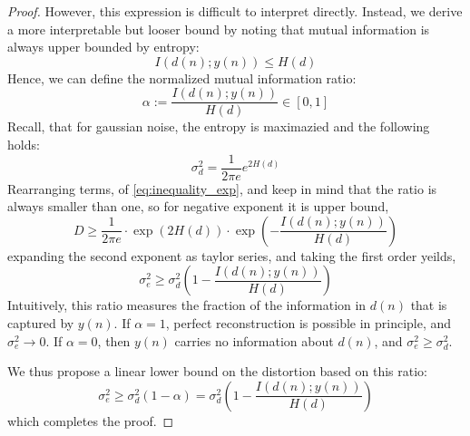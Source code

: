 \documentclass[10pt,a4paper]{amsart}
\begin{document}
\begin{proof}
However, this expression is difficult to interpret directly. Instead, we derive a more interpretable but looser bound by noting that mutual information is always upper bounded by entropy:
\[
I(d(n); y(n)) \leq H(d)
\]
Hence, we can define the normalized mutual information ratio:
\[
\alpha := \frac{I(d(n); y(n))}{H(d)} \in [0, 1]
\]
Recall, that for gaussian noise, the entropy is maximazied and the following holds:
\[
\sigma^2_d  = \frac{1}{2\pi e}e^{2H(d)} \]
Rearranging terms, of \eqref{eq:inequality_exp}, and keep in mind that the ratio is always smaller than one, so for negative exponent it is upper bound,
\[
D \geq \frac{1}{2\pi e} \cdot \exp\left(2H(d)\right) \cdot \exp\left(- \frac{I(d(n); y(n))}{H(d)}\right)
\]
expanding the second exponent as taylor series, and taking the first order yeilds,
\begin{equation}
\sigma_e^2 \geq \sigma_d^2 \left(1 - \frac{I(d(n); y(n))}{H(d)} \right)
\end{equation}
Intuitively, this ratio measures the fraction of the information in \( d(n) \) that is captured by \( y(n) \). If \( \alpha = 1 \), perfect reconstruction is possible in principle, and \( \sigma_e^2 \to 0 \). If \( \alpha = 0 \), then \( y(n) \) carries no information about \( d(n) \), and \( \sigma_e^2 \geq \sigma_d^2 \).

We thus propose a linear lower bound on the distortion based on this ratio:
\begin{equation}
\sigma_e^2 \geq \sigma_d^2 (1 - \alpha) = \sigma_d^2 \left(1 - \frac{I(d(n); y(n))}{H(d)}\right)
\end{equation}
which completes the proof.
\end{proof}
\end{document}
